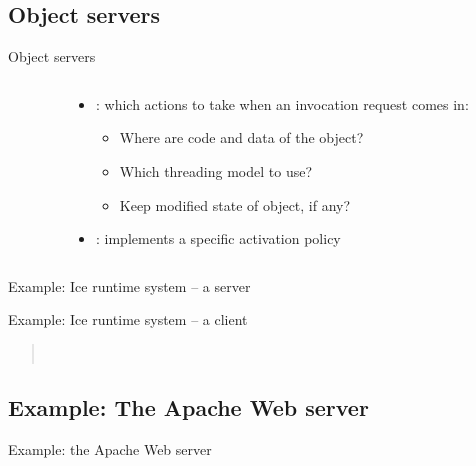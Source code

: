\subsection{Object servers}
\begin{slide}{Object servers}
  \begin{columns}[T]
    \begin{column}{0.35\textwidth}
    \end{column}
    \begin{column}{0.6\textwidth}
      \begin{itemize}
      \item {}: which actions to take when an invocation request comes in:
        \begin{itemize}\firmlist
        \item Where are code and data of the object?
        \item Which threading model to use?
        \item Keep modified state of object, if any?
        \end{itemize}
      \item {}: implements a specific activation policy
      \end{itemize}
    \end{column}
  \end{columns}
\end{slide}
\begin{slide}{Example: Ice runtime system -- a server}
  \begin{centerfig}
  \end{centerfig}
\end{slide}
\begin{slide}{Example: Ice runtime system -- a client }
  \begin{centerfig}
  \end{centerfig}
  \begin{quote}
     \\
  \end{quote}
\end{slide}
\subsection{Example: The Apache Web server}
\begin{slide}{Example: the Apache Web server}
  \begin{centerfig}
  \end{centerfig}
\end{slide}
